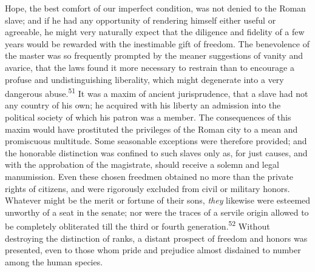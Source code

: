 
Hope, the best comfort of our imperfect condition, was not denied
to the Roman slave; and if he had any opportunity of rendering
himself either useful or agreeable, he might very naturally
expect that the diligence and fidelity of a few years would be
rewarded with the inestimable gift of freedom. The benevolence of
the master was so frequently prompted by the meaner suggestions
of vanity and avarice, that the laws found it more necessary to
restrain than to encourage a profuse and undistinguishing
liberality, which might degenerate into a very dangerous abuse.\textsuperscript{51}
It was a maxim of ancient jurisprudence, that a slave had not
any country of his own; he acquired with his liberty an admission
into the political society of which his patron was a member. The
consequences of this maxim would have prostituted the privileges
of the Roman city to a mean and promiscuous multitude. Some
seasonable exceptions were therefore provided; and the honorable
distinction was confined to such slaves only as, for just causes,
and with the approbation of the magistrate, should receive a
solemn and legal manumission. Even these chosen freedmen obtained
no more than the private rights of citizens, and were rigorously
excluded from civil or military honors. Whatever might be the
merit or fortune of their sons, \textit{they} likewise were esteemed
unworthy of a seat in the senate; nor were the traces of a
servile origin allowed to be completely obliterated till the
third or fourth generation.\textsuperscript{52} Without destroying the distinction
of ranks, a distant prospect of freedom and honors was presented,
even to those whom pride and prejudice almost disdained to number
among the human species.


